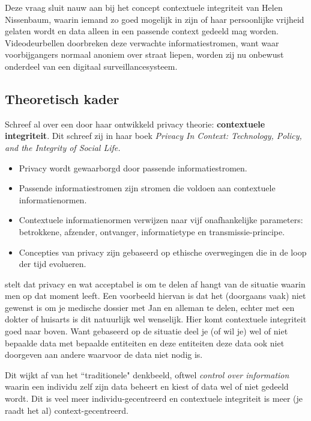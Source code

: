 \documentclass[nonacm, sigconf, balance=true]{acmart}
\begin{document}

    Deze vraag sluit nauw aan bij het concept contextuele integriteit van Helen Nissenbaum, waarin iemand zo goed mogelijk in zijn of haar persoonlijke vrijheid gelaten wordt en data alleen in een passende context gedeeld mag worden.
    Videodeurbellen doorbreken deze verwachte informatiestromen, want waar voorbijgangers normaal anoniem over straat liepen, worden zij nu onbewust onderdeel van een digitaal surveillancesysteem.


    \subsection{Theoretisch kader}

    \parencite{nissenbaum2009privacy} Schreef al over een door haar ontwikkeld privacy theorie: \textbf{contextuele integriteit}.
    Dit schreef zij in haar boek \textit{Privacy In Context: Technology, Policy, and the Integrity of Social Life.}

    \vsmall
    \begin{itemize}
        \item Privacy wordt gewaarborgd door passende informatiestromen.
        \item Passende informatiestromen zijn stromen die voldoen aan contextuele informatienormen.
        \item Contextuele informatienormen verwijzen naar vijf onafhankelijke parameters: betrokkene, afzender, ontvanger, informatietype en transmissie-principe.
        \item Concepties van privacy zijn gebaseerd op ethische overwegingen die in de loop der tijd evolueren.
    \end{itemize}
    \vsmall

    \citeauthor{nissenbaum2009privacy} stelt dat privacy en wat acceptabel is om te delen af hangt van de situatie waarin men op dat moment leeft.
    Een voorbeeld hiervan is dat het (doorgaans vaak) niet gewenst is om je medische dossier met Jan en alleman te delen, echter met een dokter of huisarts is dit natuurlijk wel wenselijk.
    Hier komt contextuele integriteit goed naar boven.
    Want gebaseerd op de situatie deel je (of wil je) wel of niet bepaalde data met bepaalde entiteiten en deze entiteiten deze data ook niet doorgeven aan andere waarvoor de data niet nodig is.

    Dit wijkt af van het ``traditionele" denkbeeld, oftwel \textit{control over information} waarin een individu zelf zijn data beheert en kiest of data wel of niet gedeeld wordt.
    Dit is veel meer individu-gecentreerd en contextuele integriteit is meer (je raadt het al) context-gecentreerd.
\end{document}
